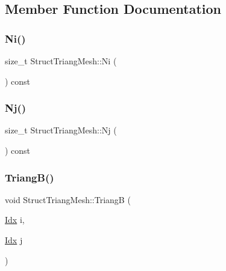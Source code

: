 \subsection{Member Function Documentation}
\mbox{\label{structStructTriangMesh_abb1191f09789979668d3a8cb360d2005}} 
\subsubsection{\texorpdfstring{Ni()}{Ni()}}
{\footnotesize\ttfamily size\+\_\+t Struct\+Triang\+Mesh\+::\+Ni (\begin{DoxyParamCaption}{ }\end{DoxyParamCaption}) const\hspace{0.3cm}{\ttfamily [inline]}}

\mbox{\label{structStructTriangMesh_a5474a55a2ecde06204640b01c7f76438}} 
\subsubsection{\texorpdfstring{Nj()}{Nj()}}
{\footnotesize\ttfamily size\+\_\+t Struct\+Triang\+Mesh\+::\+Nj (\begin{DoxyParamCaption}{ }\end{DoxyParamCaption}) const\hspace{0.3cm}{\ttfamily [inline]}}

\mbox{\label{structStructTriangMesh_a7e4bf4fd8c7addb9d4ca6414530409fa}} 
\subsubsection{\texorpdfstring{Triang\+B()}{TriangB()}}
{\footnotesize\ttfamily void Struct\+Triang\+Mesh\+::\+TriangB (\begin{DoxyParamCaption}\item[{\hyperlink{Includes_8h_ae78891cd308078a2f5f9e7193065c805}{Idx}}]{i,  }\item[{\hyperlink{Includes_8h_ae78891cd308078a2f5f9e7193065c805}{Idx}}]{j }\end{DoxyParamCaption})\hspace{0.3cm}{\ttfamily [private]}}

